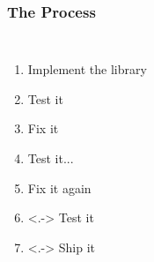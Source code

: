 \documentclass[xcolor=dvipsnames]{beamer}
\begin{document}
\begin{frame}
  \frametitle{The Process}
  \begin{center}
    \begin{columns}
      \begin{enumerate}
      \item Implement the library
      \item Test it
      \item Fix it
      \item<+-> Test it...
      \item<+-> Fix it again
      \item<.-> Test it
      \item<.-> Ship it
      \end{enumerate}
      \onslide<+->{%
        {\huge \textbf{\euro\euro\euro} !!}
      }
    \end{columns}
  \end{center}
\end{frame}
\end{document}
